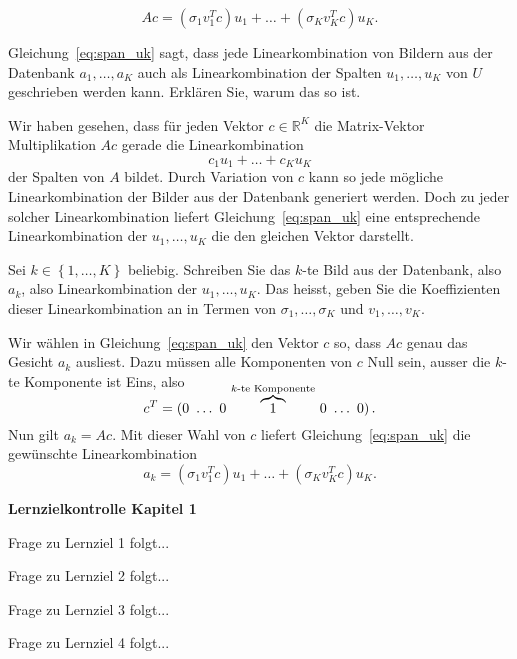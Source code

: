 \begin{equation}\label{eq:span_uk}
	Ac =\left(\sigma_1 v_1^Tc\right) u_1+\ldots+\left(\sigma_K v_K^Tc\right) u_K.
\end{equation}
\begin{aufgabe}
	Gleichung~\eqref{eq:span_uk} sagt, dass jede Linearkombination von Bildern aus der Datenbank $a_1,\ldots,a_K$ auch als Linearkombination der Spalten $u_1,\ldots,u_K$ von $U$ geschrieben werden kann.
	Erklären Sie, warum das so ist.
\end{aufgabe}
\begin{losung*}
	Wir haben gesehen, dass für jeden Vektor $c\in\mathbb R^K$ die Matrix-Vektor Multiplikation $Ac$ gerade die Linearkombination
	\begin{equation*}
		c_1u_1+\ldots+c_Ku_K
	\end{equation*}
	der Spalten von $A$ bildet.
	Durch Variation von $c$ kann so jede mögliche Linearkombination der Bilder aus der Datenbank generiert werden.
	Doch zu jeder solcher Linearkombination liefert Gleichung~\eqref{eq:span_uk} eine entsprechende Linearkombination der $u_1,\ldots,u_K$ die den gleichen Vektor darstellt.
\end{losung*}
\begin{aufgabe}
	Sei $k\in\left\{1,\ldots,K\right\}$ beliebig.
	Schreiben Sie das $k$-te Bild aus der Datenbank, also $a_k$, also Linearkombination der $u_1,\ldots,u_K$.
	Das heisst, geben Sie die Koeffizienten dieser Linearkombination an in Termen von $\sigma_1,\ldots,\sigma_K$ und $v_1,\dots,v_K$.
\end{aufgabe}
\begin{losung*}
	Wir wählen in Gleichung~\ref{eq:span_uk} den Vektor $c$ so, dass $Ac$ genau das Gesicht $a_k$ ausliest.
	Dazu müssen alle Komponenten von $c$ Null sein, ausser die $k$-te Komponente ist Eins, also
	\begin{equation*}
		c^T=\left(0\ \ldots\ 0\ \smash{\overbrace{1}^{k\textrm{-te Komponente}}}\ 0\ \ldots\ 0\right).
	\end{equation*}
	Nun gilt $a_k=Ac$.
	Mit dieser Wahl von $c$ liefert Gleichung~\eqref{eq:span_uk} die gewünschte Linearkombination
	\begin{equation*}
		a_k=\left(\sigma_1 v_1^Tc\right) u_1+\ldots+\left(\sigma_K v_K^Tc\right) u_K.
	\end{equation*}
\end{losung*}

\begin{tcolorbox}
	\centerline{\textbf{Lernzielkontrolle Kapitel 1}}
	\begin{aufgabe}
		Frage zu Lernziel 1 folgt...
	\end{aufgabe}
	\begin{aufgabe}
		Frage zu Lernziel 2 folgt...
	\end{aufgabe}
	\begin{aufgabe}
		Frage zu Lernziel 3 folgt...
	\end{aufgabe}
	\begin{aufgabe}
		Frage zu Lernziel 4 folgt...
	\end{aufgabe}
\end{tcolorbox}

